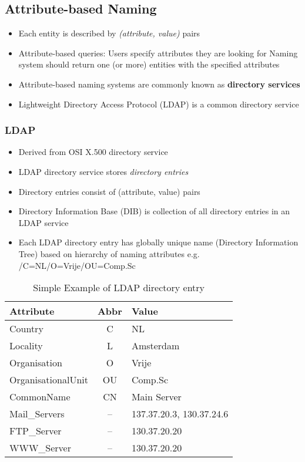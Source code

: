 \subsection{Attribute-based Naming}
\begin{itemize}
	\item Each entity is described by \textit{(attribute, value)} pairs
	\item Attribute-based queries:
	\subitem Users specify attributes they are looking for
	\subitem Naming system should return one (or more) entities with the specified attributes
	\item Attribute-based naming systems are commonly known as \textbf{directory services}
	\item Lightweight Directory Access Protocol (LDAP) is a common directory service	
\end{itemize}

\subsubsection{LDAP}
\begin{itemize}
	\item Derived from OSI X.500 directory service
	\item LDAP directory service stores \textit{directory entries}
	\item Directory entries consist of (attribute, value) pairs
	\item Directory Information Base (DIB) is collection of all directory entries in an LDAP service
	\item Each LDAP directory entry has globally unique name (Directory Information Tree) based on hierarchy of naming attributes
	\subitem e.g. /C=NL/O=Vrije/OU=Comp.Sc	
\end{itemize}
\begin{table}[H]
	\centering
	\caption{Simple Example of LDAP directory entry}
	\begin{tabular}{lc|l}
		\textbf{Attribute} & \textbf{Abbr} & \textbf{Value}\\\hline
		Country & C & NL\\
		Locality & L & Amsterdam\\
		Organisation & O & Vrije\\
		OrganisationalUnit & OU & Comp.Sc\\
		CommonName & CN & Main Server\\
		Mail\_Servers & -- & 137.37.20.3, 130.37.24.6\\
		FTP\_Server & -- & 130.37.20.20\\
		WWW\_Server & -- & 130.37.20.20	
	\end{tabular}
\end{table}

